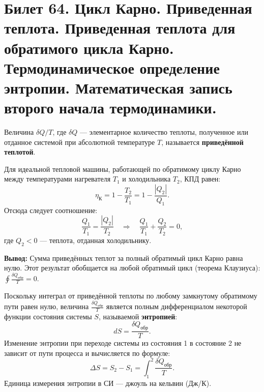 \section{Билет 64. Цикл Карно. Приведенная теплота. Приведенная теплота для обратимого цикла Карно. Термодинамическое определение энтропии. Математическая запись второго начала термодинамики.}

\begin{definition}
Величина $\delta Q / T$, где $\delta Q$ --- элементарное количество теплоты, полученное или отданное системой при абсолютной температуре $T$, называется \textbf{приведённой теплотой}.
\end{definition}

\begin{theorem}
Для идеальной тепловой машины, работающей по обратимому циклу Карно между температурами нагревателя $T_1$ и холодильника $T_2$, КПД равен:
\begin{equation}
    \eta_{\text{К}} = 1 - \frac{T_2}{T_1} = 1 - \frac{|Q_2|}{Q_1}.
\end{equation}
Отсюда следует соотношение:
\begin{equation}
    \frac{Q_1}{T_1} = \frac{|Q_2|}{T_2} \quad \Rightarrow \quad \frac{Q_1}{T_1} + \frac{Q_2}{T_2} = 0, \label{eq:carnot_reduced_heat}
\end{equation}
где $Q_2 < 0$ --- теплота, отданная холодильнику.
\par\noindent\textbf{Вывод:} Сумма приведённых теплот за полный обратимый цикл Карно равна нулю. Этот результат обобщается на любой обратимый цикл (теорема Клаузиуса): $\oint \frac{\delta Q_{\text{обр}}}{T} = 0$.
\end{theorem}

\begin{definition}
Поскольку интеграл от приведённой теплоты по любому замкнутому обратимому пути равен нулю, величина $\frac{\delta Q_{\text{обр}}}{T}$ является полным дифференциалом некоторой функции состояния системы $S$, называемой \textbf{энтропией}:
\begin{equation}
    dS = \frac{\delta Q_{\text{обр}}}{T}. \label{eq:entropy_def}
\end{equation}
Изменение энтропии при переходе системы из состояния 1 в состояние 2 не зависит от пути процесса и вычисляется по формуле:
\begin{equation}
    \Delta S = S_2 - S_1 = \int_1^2 \frac{\delta Q_{\text{обр}}}{T}. \label{eq:delta_S}
\end{equation}
Единица измерения энтропии в СИ --- джоуль на кельвин (Дж/К).
\end{definition}

